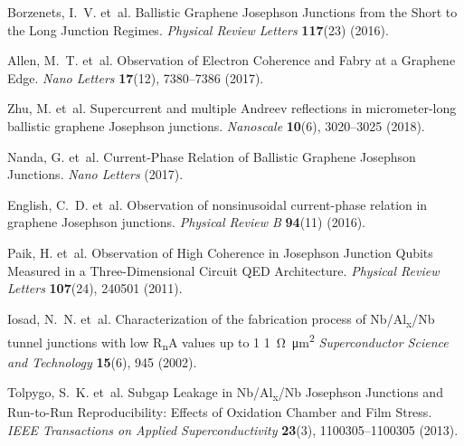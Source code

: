\documentclass[preprint,
  onecolumn,
  notitlepage,
  amsmath,amssymb,
  aip,
  apl,
]{revtex4-1}
\begin{document}
\begin{thebibliography}{10}
	Borzenets, I.~V. et~al.
	\newblock Ballistic {{Graphene Josephson Junctions}} from the {{Short}} to the
	{{Long Junction Regimes}}.
	\newblock \emph{Physical Review Letters} \textbf{117}(23) (2016).
	
	Allen, M.~T. et~al.
	\newblock Observation of {{Electron Coherence}} and
	{{Fabry}} at a {{Graphene Edge}}.
	\newblock \emph{Nano Letters} \textbf{17}(12), 7380--7386 (2017).
	
	Zhu, M. et~al.
	\newblock Supercurrent and multiple {{Andreev}} reflections in micrometer-long
	ballistic graphene {{Josephson}} junctions.
	\newblock \emph{Nanoscale} \textbf{10}(6), 3020--3025 (2018).
	
	Nanda, G. et~al.
	\newblock Current-{{Phase Relation}} of {{Ballistic Graphene Josephson
			Junctions}}.
	\newblock \emph{Nano Letters}  (2017).
	
	English, C.~D. et~al.
	\newblock Observation of nonsinusoidal current-phase relation in graphene
	{{Josephson}} junctions.
	\newblock \emph{Physical Review B} \textbf{94}(11) (2016).
	
	Paik, H. et~al.
	\newblock Observation of {{High Coherence}} in {{Josephson Junction Qubits
			Measured}} in a {{Three}}-{{Dimensional Circuit QED Architecture}}.
	\newblock \emph{Physical Review Letters} \textbf{107}(24), 240501 (2011).
	
	Iosad, N.~N. et~al.
	\newblock Characterization of the fabrication process of
	{{Nb}}/{{Al}}\textsubscript{x}/{{Nb}} tunnel junctions with low {{R}}\textsubscript{n}{{A}} values up to 1 \SI{1}{\ohm.\micro\metre^2}
	\newblock \emph{Superconductor Science and Technology} \textbf{15}(6), 945
	(2002).
	
	Tolpygo, S.~K. et~al.
	\newblock Subgap {{Leakage}} in {{Nb}}/{{Al}}\textsubscript{x}/{{Nb}} 
		 {{Josephson Junctions}} and {{Run}}-to-{{Run
			Reproducibility}}: {{Effects}} of {{Oxidation Chamber}} and {{Film Stress}}.
	\newblock \emph{IEEE Transactions on Applied Superconductivity} \textbf{23}(3),
	1100305--1100305 (2013).
	

\end{thebibliography}
\end{document}
